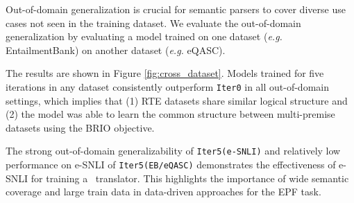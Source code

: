 Out-of-domain generalization is crucial for semantic parsers to cover diverse use cases not seen in the training dataset. We evaluate the out-of-domain generalization by evaluating a model trained on one dataset (\textit{e.g.} EntailmentBank) on another dataset (\textit{e.g.} eQASC).

The results are shown in Figure \ref{fig:cross_dataset}. Models trained for five iterations in any dataset consistently outperform \texttt{Iter0} in all out-of-domain settings, which implies that (1) RTE datasets share similar logical structure and (2) the model was able to learn the common structure between multi-premise datasets using the BRIO objective.

The strong out-of-domain generalizability of \texttt{Iter5(e-SNLI)} and relatively low performance on e-SNLI of \texttt{Iter5(EB/eQASC)} demonstrates the effectiveness of e-SNLI for training a \nltofol\ translator. This highlights the importance of wide semantic coverage and large train data in data-driven approaches for the EPF task.
